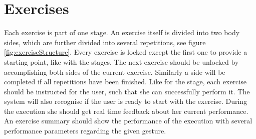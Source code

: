 \section{Exercises}\label{4_4_exercises}
Each exercise is part of one stage. An exercise itself is divided into two body sides, which are further divided into several repetitions, see figure \ref{fig:exerciseStructure}. Every exercise is locked except the first one to provide a starting point, like with the stages. The next exercise should be unlocked by accomplishing both sides of the current exercise. Similarly a side will be completed if all repetitions have been finished. Like for the stage, each exercise should be instructed for the user, such that she can successfully perform it. The system will also recognise if the user is ready to start with the exercise. During the execution she should get real time feedback about her current performance. An exercise summary should show the performance of the execution with several performance parameters regarding the given gesture.

